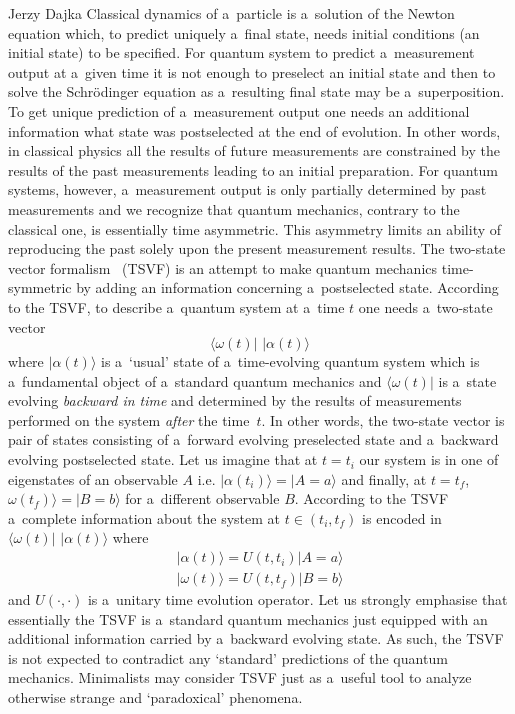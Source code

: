 \begin{artengenv}{Jerzy Dajka}
Classical dynamics of a~particle is a~solution of the Newton equation which, to predict uniquely a~final state, needs initial conditions (an initial state) to be specified. For quantum system to predict a~measurement output at a~given time it is not enough to preselect an initial state and then to solve the Schr\"{o}dinger equation as a~resulting final state may be a~superposition. To get unique prediction of a~measurement output one needs an additional information what state was postselected at the end of evolution.  In other words, in classical physics all the results of future measurements are constrained by the results of the past measurements leading to an initial preparation. For quantum systems, however, a~measurement output is only partially determined by past measurements and we recognize that quantum mechanics, contrary to the classical one, is essentially time asymmetric. This asymmetry limits an ability of reproducing the  past solely upon the present measurement results. The two-state vector formalism~\parencite{Aharonov2008} (TSVF) is an attempt to make quantum mechanics time-symmetric by adding an information concerning a~postselected state. According to the TSVF, to describe a~quantum system at a~time $t$ one needs a~two-state vector
\begin{equation}\label{tsv}
    \langle \omega(t)|\,\,|\alpha(t)\rangle
\end{equation}
where $|\alpha(t)\rangle$ is a~`usual' state of a~time-evolving quantum system which is a~fundamental object of a~standard quantum mechanics and $\langle\omega(t)|$ is a~state evolving {\it backward in time} and  determined by the results of measurements performed on the system {\it after} the time~$t$. In other words, the two-state vector is pair of states consisting of   a~forward evolving preselected state  and a~backward evolving postselected state. 
Let us imagine that at $t=t_i$ our system is in one of eigenstates of an observable $A$ i.e. $|\alpha(t_i)\rangle=|A=a\rangle$ and finally, at $t=t_f$, $\omega(t_f)\rangle=|B=b\rangle$ for a~different observable $B$. According to the TSVF a~complete information about the system at $t\in(t_i,t_f)$ is encoded in $\langle \omega(t)|\,\,|\alpha(t)\rangle$ where
\begin{equation}
   \begin{split}
       |\alpha(t)\rangle = U(t,t_i)|A=a\rangle\\
       |\omega(t)\rangle= U(t,t_f)|B=b\rangle
   \end{split}
\end{equation}
and $U(\cdot,\cdot)$ is a~unitary time evolution operator. 
Let us strongly emphasise that essentially the TSVF is a~standard quantum mechanics just equipped with an additional information carried by a~backward evolving state. As such, the TSVF is not expected to contradict any `standard' predictions of the quantum mechanics.  Minimalists may consider TSVF just as a~useful tool to analyze otherwise strange and `paradoxical' phenomena.   



\end{artengenv}
